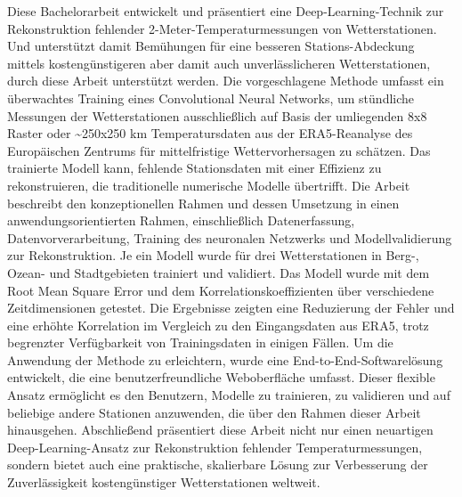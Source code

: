 Diese Bachelorarbeit entwickelt und präsentiert eine Deep-Learning-Technik zur Rekonstruktion fehlender 2-Meter-Temperaturmessungen von Wetterstationen.
Und unterstützt damit Bemühungen für eine besseren Stations-Abdeckung mittels kostengünstigeren aber damit auch unverlässlicheren Wetterstationen, durch diese Arbeit unterstützt werden.
Die vorgeschlagene Methode umfasst ein überwachtes Training eines Convolutional Neural Networks, um stündliche Messungen der Wetterstationen ausschließlich auf Basis der umliegenden 8x8 Raster oder \textasciitilde 250x250 km Temperatursdaten aus der ERA5-Reanalyse des Europäischen Zentrums für mittelfristige Wettervorhersagen zu schätzen.
Das trainierte Modell kann, fehlende Stationsdaten mit einer Effizienz zu rekonstruieren, die traditionelle numerische Modelle übertrifft.
Die Arbeit beschreibt den konzeptionellen Rahmen und dessen Umsetzung in einen anwendungsorientierten Rahmen, einschließlich Datenerfassung, Datenvorverarbeitung, Training des neuronalen Netzwerks und Modellvalidierung zur Rekonstruktion.
Je ein Modell wurde für drei Wetterstationen in Berg-, Ozean- und Stadtgebieten trainiert und validiert.
Das Modell wurde mit dem Root Mean Square Error und dem Korrelationskoeffizienten über verschiedene Zeitdimensionen getestet.
Die Ergebnisse zeigten eine Reduzierung der Fehler und eine erhöhte Korrelation im Vergleich zu den Eingangsdaten aus ERA5, trotz begrenzter Verfügbarkeit von Trainingsdaten in einigen Fällen.
Um die Anwendung der Methode zu erleichtern, wurde eine End-to-End-Softwarelösung entwickelt, die eine benutzerfreundliche Weboberfläche umfasst.
Dieser flexible Ansatz ermöglicht es den Benutzern, Modelle zu trainieren, zu validieren und auf beliebige andere Stationen anzuwenden, die über den Rahmen dieser Arbeit hinausgehen.
Abschließend präsentiert diese Arbeit nicht nur einen neuartigen Deep-Learning-Ansatz zur Rekonstruktion fehlender Temperaturmessungen, sondern bietet auch eine praktische, skalierbare Lösung zur Verbesserung der Zuverlässigkeit kostengünstiger Wetterstationen weltweit.